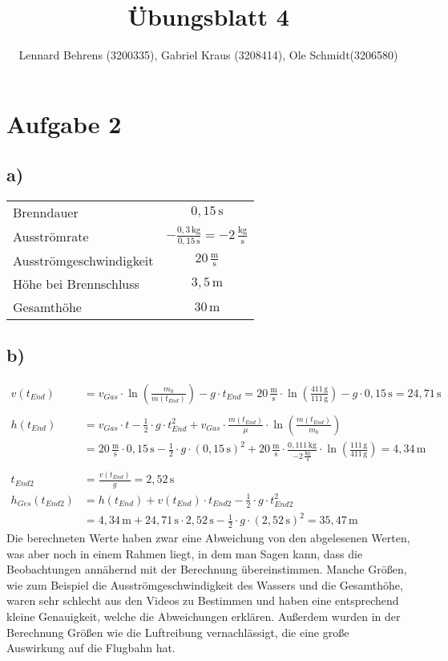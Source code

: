 \documentclass[a4paper,10pt]{extarticle}
\title{Übungsblatt 4}
\author{Lennard Behrens (3200335), Gabriel Kraus (3208414), Ole Schmidt(3206580)}
\begin{document}
\maketitle

\section*{Aufgabe 2}
\subsection*{a)}
\begin{tabular}{lc}
Brenndauer & $0,15\,\mathrm{s}$\\
Ausströmrate & $-\frac{0,3\,\mathrm{kg}}{0,15\,\mathrm{s}}=-2\,\frac{\mathrm{kg}}{\mathrm{s}}$\\
Ausströmgeschwindigkeit & $20\,\frac{\mathrm{m}}{\mathrm{s}}$\\
Höhe bei Brennschluss & $3,5\,\mathrm{m}$\\
Gesamthöhe & $30\,\mathrm{m}$\\
\end{tabular}

\subsection*{b)}
\begin{align*}
v\left(t_{End}\right)&=v_{Gas}\cdot\ln\left(\frac{m_0}{m\left(t_{End}\right)}\right)-g\cdot t_{End}=20\,\frac{\mathrm{m}}{\mathrm{s}}\cdot\ln\left(\frac{411\,\mathrm{g}}{111\,\mathrm{g}}\right)-g\cdot0,15\,\mathrm{s}=24,71\,\mathrm{s}\\ \\
h\left(t_{End}\right)&=v_{Gas}\cdot t-\frac{1}{2}\cdot g\cdot t_{End}^2+v_{Gas}\cdot\frac{m\left(t_{End}\right)}{\mu}\cdot\ln\left(\frac{m\left(t_{End}\right)}{m_0}\right)\\
&=20\,\frac{\mathrm{m}}{\mathrm{s}}\cdot 0,15\,\mathrm{s}-\frac{1}{2}\cdot g\cdot \left(0,15\,\mathrm{s}\right)^2+20\,\frac{\mathrm{m}}{\mathrm{s}}\cdot\frac{0,111\,\mathrm{kg}}{-2\,\frac{\mathrm{kg}}{\mathrm{s}}}\cdot\ln\left(\frac{111\,\mathrm{g}}{411\,\mathrm{g}}\right)=4,34\,\mathrm{m}\\ \\
t_{End2}&=\frac{v\left(t_{End}\right)}{g}=2,52\,\mathrm{s}\\
h_{Ges}\left(t_{End2}\right)&=h\left(t_{End}\right)+v\left(t_{End}\right)\cdot t_{End2}-\frac{1}{2}\cdot g\cdot t_{End2}^2\\
&=4,34\,\mathrm{m}+24,71\,\mathrm{s}\cdot 2,52\,\mathrm{s}-\frac{1}{2}\cdot g\cdot\left(2,52\,\mathrm{s}\right)^2=35,47\,\mathrm{m}
\end{align*}
Die berechneten Werte haben zwar eine Abweichung von den abgelesenen Werten, was aber noch in einem Rahmen liegt, in dem man Sagen kann, dass die Beobachtungen annähernd mit der Berechnung übereinstimmen. Manche Größen, wie zum Beispiel die Ausströmgeschwindigkeit des Wassers und die Gesamthöhe, waren sehr schlecht aus den Videos zu Bestimmen und haben eine entsprechend kleine Genauigkeit, welche die Abweichungen erklären. Außerdem wurden in der Berechnung Größen wie die Luftreibung vernachlässigt, die eine große Auswirkung auf die Flugbahn hat.
\end{document}
